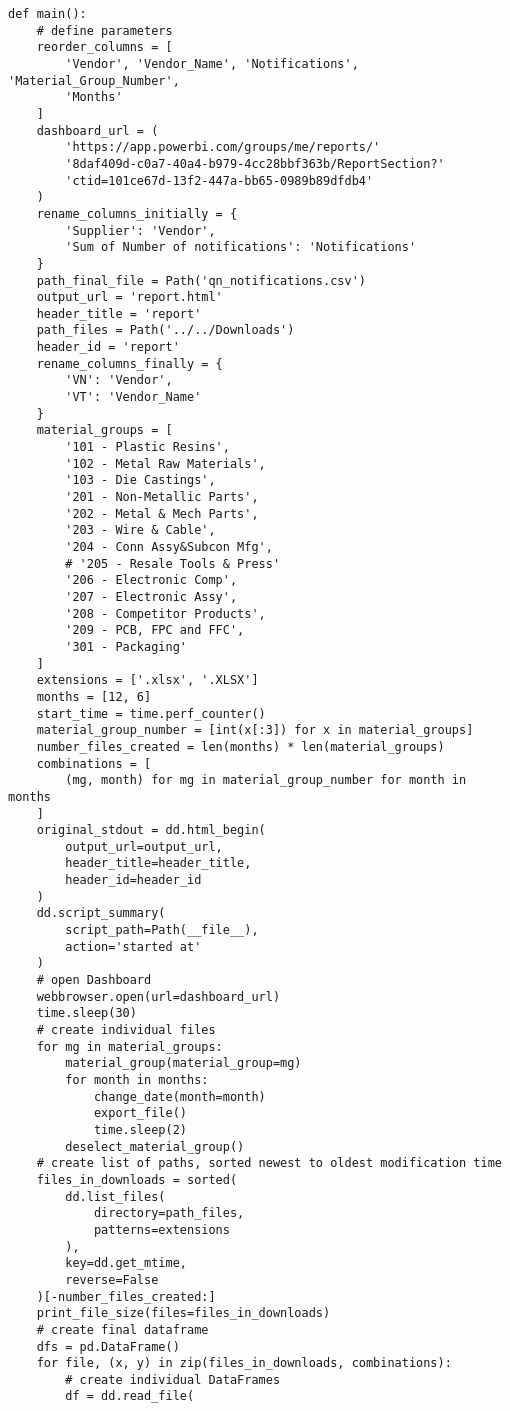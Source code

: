 \documentclass[10pt, letterpaper, twoside]{article}
\begin{document}
\begin{footnotesize}
\begin{verbatim}
def main():
    # define parameters
    reorder_columns = [
        'Vendor', 'Vendor_Name', 'Notifications', 'Material_Group_Number',
        'Months'
    ]
    dashboard_url = (
        'https://app.powerbi.com/groups/me/reports/'
        '8daf409d-c0a7-40a4-b979-4cc28bbf363b/ReportSection?'
        'ctid=101ce67d-13f2-447a-bb65-0989b89dfdb4'
    )
    rename_columns_initially = {
        'Supplier': 'Vendor',
        'Sum of Number of notifications': 'Notifications'
    }
    path_final_file = Path('qn_notifications.csv')
    output_url = 'report.html'
    header_title = 'report'
    path_files = Path('../../Downloads')
    header_id = 'report'
    rename_columns_finally = {
        'VN': 'Vendor',
        'VT': 'Vendor_Name'
    }
    material_groups = [
        '101 - Plastic Resins',
        '102 - Metal Raw Materials',
        '103 - Die Castings',
        '201 - Non-Metallic Parts',
        '202 - Metal & Mech Parts',
        '203 - Wire & Cable',
        '204 - Conn Assy&Subcon Mfg',
        # '205 - Resale Tools & Press'
        '206 - Electronic Comp',
        '207 - Electronic Assy',
        '208 - Competitor Products',
        '209 - PCB, FPC and FFC',
        '301 - Packaging'
    ]
    extensions = ['.xlsx', '.XLSX']
    months = [12, 6]
    start_time = time.perf_counter()
    material_group_number = [int(x[:3]) for x in material_groups]
    number_files_created = len(months) * len(material_groups)
    combinations = [
        (mg, month) for mg in material_group_number for month in months
    ]
    original_stdout = dd.html_begin(
        output_url=output_url,
        header_title=header_title,
        header_id=header_id
    )
    dd.script_summary(
        script_path=Path(__file__),
        action='started at'
    )
    # open Dashboard
    webbrowser.open(url=dashboard_url)
    time.sleep(30)
    # create individual files
    for mg in material_groups:
        material_group(material_group=mg)
        for month in months:
            change_date(month=month)
            export_file()
            time.sleep(2)
        deselect_material_group()
    # create list of paths, sorted newest to oldest modification time
    files_in_downloads = sorted(
        dd.list_files(
            directory=path_files,
            patterns=extensions
        ),
        key=dd.get_mtime,
        reverse=False
    )[-number_files_created:]
    print_file_size(files=files_in_downloads)
    # create final dataframe
    dfs = pd.DataFrame()
    for file, (x, y) in zip(files_in_downloads, combinations):
        # create individual DataFrames
        df = dd.read_file(

\end{verbatim}
\end{footnotesize}
\end{document}
